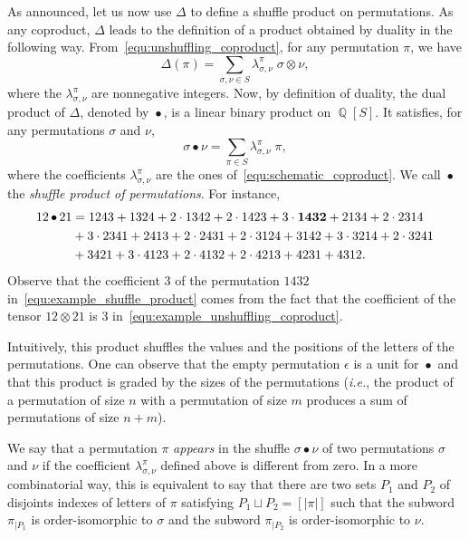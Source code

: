 \documentclass[a4paper]{llncs}
\DeclareMathOperator{\QQ}{\mathbb{Q}}
\DeclareMathOperator{\SHUFFLE}{\bullet}
\begin{document}
As announced, let us now use $\Delta$ to define a shuffle product on
permutations. As any coproduct, $\Delta$ leads to the definition of a
product obtained by duality in the following way.
From~\eqref{equ:unshuffling_coproduct}, for any permutation $\pi$, we
have
\begin{equation} \label{equ:schematic_coproduct}
    \Delta(\pi) =
    \sum_{\sigma, \nu \in S} \lambda_{\sigma, \nu}^\pi \;
    \sigma \otimes \nu,
\end{equation}
where the $\lambda_{\sigma, \nu}^\pi$ are nonnegative integers. Now,
by definition of duality, the dual product of $\Delta$, denoted by
$\SHUFFLE$, is a linear binary product on $\QQ[S]$. It satisfies, for
any permutations $\sigma$ and $\nu$,
\begin{equation}
    \sigma \SHUFFLE \nu =
    \sum_{\pi \in S}
    \lambda_{\sigma, \nu}^\pi \; \pi,
\end{equation}
where the coefficients $\lambda_{\sigma, \nu}^\pi$ are the ones
of~\eqref{equ:schematic_coproduct}. We call $\SHUFFLE$ the
{\em shuffle product of permutations}. For instance,
\begin{equation}\begin{split} \label{equ:example_shuffle_product}
    12 \SHUFFLE 21 & =
    1243 + 1324 + 2 \cdot 1342 + 2 \cdot 1423 + 3 \cdot {\bf 1432} + 
    2134 + 2 \cdot 2314 \\
    & + 3 \cdot 2341 + 2413 + 2 \cdot 2431 + 2 \cdot 3124 + 3142 + 
    3 \cdot 3214 + 2 \cdot 3241 \\
    & + 3421 + 3 \cdot 4123 + 2 \cdot 4132 + 2 \cdot 4213 + 4231 + 4312.
\end{split}\end{equation}
Observe that the coefficient $3$ of the permutation $1432$
in~\eqref{equ:example_shuffle_product} comes from the fact that the
coefficient of the tensor $12 \otimes 21$ is $3$
in~\eqref{equ:example_unshuffling_coproduct}.

Intuitively, this product shuffles the values and the positions of the
letters of the permutations. One can observe that the empty permutation 
$\epsilon$ is a unit for $\SHUFFLE$ and that this product is graded by 
the sizes of the permutations ({\em i.e.}, the product of a permutation 
of size $n$ with a permutation of size $m$ produces a sum of permutations 
of size $n + m$).

We say that a permutation $\pi$ {\em appears} in the shuffle
$\sigma \SHUFFLE \nu$ of two permutations $\sigma$ and $\nu$ if the
coefficient $\lambda_{\sigma, \nu}^\pi$ defined above is different from
zero. In a more combinatorial way, this is equivalent to say that there
are two sets $P_1$ and $P_2$ of disjoints indexes of letters of $\pi$
satisfying $P_1 \sqcup P_2 = [|\pi|]$ such that the subword $\pi_{|P_1}$
is order-isomorphic to $\sigma$ and the subword $\pi_{|P_2}$ is
order-isomorphic to $\nu$.
\end{document}
